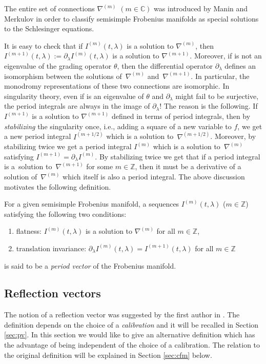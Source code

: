 \documentclass[pdftex]{sigma}
\numberwithin{equation}{section}
\newcommand{\CC}{\mathbb{C}}
\newcommand{\ZZ}{\mathbb{Z}}
\begin{document}
\begin{Remark}
The entire set of connections $\nabla^{(m)}$ $(m\in \CC)$ was introduced by Manin and
Merkulov \cite{MM1997} in order to classify semisimple Frobenius
manifolds as special solutions to the Schlesinger equations.
\end{Remark}

It is easy to check that if $I^{(m)}(t,\lambda)$ is a solution
to $\nabla^{(m)}$, then $I^{(m+1)}(t,\lambda):=\partial_\lambda
I^{(m)}(t,\lambda)$ is a solution to $\nabla^{(m+1)}$. Moreover, if
 is not an eigenvalue of the grading operator
$\theta$, then the differential
operator $\partial_\lambda$ defines an isomorphism between the
solutions of~$\nabla^{(m)}$ and~$\nabla^{(m+1)}$. In particular, the
monodromy representations of these two connections are isomorphic.
In singularity theory, even if  is an eigenvalue of
$\theta$ and $\partial_\lambda$ might fail to be surjective, the
period integrals are always in the image of $\partial_\lambda$! The
reason is the following. If
$I^{(m+1)}$ is a solution to $\nabla^{(m+1)}$ defined in terms
of period integrals, then by {\em stabilizing} the singularity once,
i.e., adding a square of a new variable to $f$, we get a new period
integral $I^{(m+1/2)}$ which is a solution to~$\nabla^{(m+1/2)}$. Moreover, by stabilizing twice we get a period
integral $I^{(m)}$ which is a solution to~$\nabla^{(m)}$ satisfying
$I^{(m+1)}=\partial_\lambda I^{(m)}$. By stabilizing twice
we get that if a period integral is a~solution to~$\nabla^{(m+1)}$ for
some $m\in \ZZ$, then it must be a derivative of a solution of~$\nabla^{(m)}$ which itself is also a period integral.
The above discussion motivates the following definition.
\begin{Definition}\label{def:pv}
For a given semisimple Frobenius manifold,
a sequences $I^{(m)}(t,\lambda)$ ($m\in \ZZ$) satisfying the
following two conditions:
\begin{enumerate}\itemsep=0pt
\item[(i)] flatness:
 $I^{(m)}(t,\lambda)$ is a solution to $\nabla^{(m)}$ for all
 $m\in \ZZ$,
\item[(ii)] translation invariance:
 $\partial_\lambda I^{(m)}(t,\lambda)=I^{(m+1)}(t,\lambda)$ for all
 $m\in \ZZ$
\end{enumerate}
is said to be a {\em period vector} of the Frobenius manifold.
\end{Definition}

\subsection{Reflection vectors}
The notion of a reflection vector was suggested by the first author in
\cite{Milanov:p2}. The definition depends on the choice of a {\em
 calibration} and it will be recalled in Section \ref{sec:pv}. In
this section we would like to give an alternative definition which has
the advantage of being independent of the choice of a calibration. The
relation to the original definition will be explained in Section
\ref{sec:cfm} below.
\end{document}
